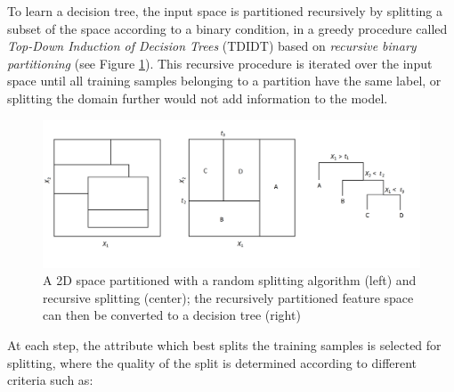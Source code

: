 To learn a decision tree, the input space is partitioned recursively by 
splitting a subset of the space according to a binary condition, in a 
greedy procedure called \textit{Top-Down Induction of Decision Trees} (TDIDT) 
based on \textit{recursive binary partitioning} (see Figure 
\ref{f:recursive_splitting}). 
This recursive procedure is iterated over the input space until all training 
samples belonging to a partition have the same label, or splitting the domain 
further would not add information to the model. 
%
\begin{figure}[h]
\includegraphics[width=1\textwidth]{pictures/recursive_splitting}
\centering
\caption[Recursive binary partitioning]{A 2D space partitioned with a random 
					splitting algorithm (left) and recursive
					splitting (center); the recursively 
					partitioned feature space can then be 
					converted to a decision tree (right)}
\label{f:recursive_splitting}
\end{figure}
%
At each step, the attribute which best splits the training samples is selected
for splitting, where the quality of the split is determined according to 
different criteria such as:
